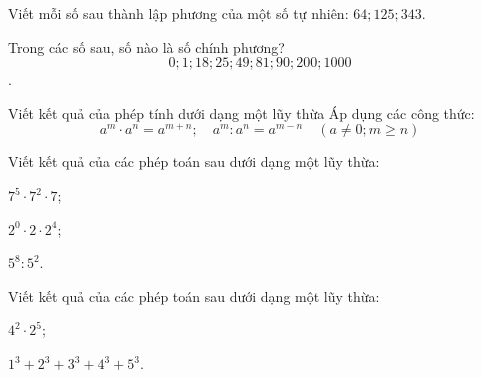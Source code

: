 \begin{vd}%
	Viết mỗi số sau thành lập phương của một số tự nhiên: $64; 125; 343$.
	
\end{vd}
\begin{vd}%
Trong các số sau, số nào là số chính phương?
$$ 0; 1; 18; 25; 49; 81; 90; 200; 1000$$.

\end{vd}
\begin{dang}{Viết kết quả của phép tính dưới dạng một lũy thừa}
	Áp dụng các công thức:
	$$a^m\cdot a^n = a^{m+n};\quad  a^m : a^n = a^{m-n} \quad \left( a\neq 0; m \geq n\right)$$
\end{dang}
\begin{vd}%
	Viết kết quả của các phép toán sau dưới dạng một lũy thừa:
	\begin{enumEX}{3}
		\item $7^5\cdot 7^2\cdot 7$;
		\item $2^0\cdot 2\cdot 2^4$;
		\item $5^8 : 5^2$.
	\end{enumEX}
\end{vd}
\begin{vd}%
	Viết kết quả của các phép toán sau dưới dạng một lũy thừa:
	\begin{enumEX}{2}
		\item $4^2\cdot 2^5$;
		\item $1^3 + 2^3 + 3^3 + 4^3 + 5^3$.
	\end{enumEX}
\end{vd}
